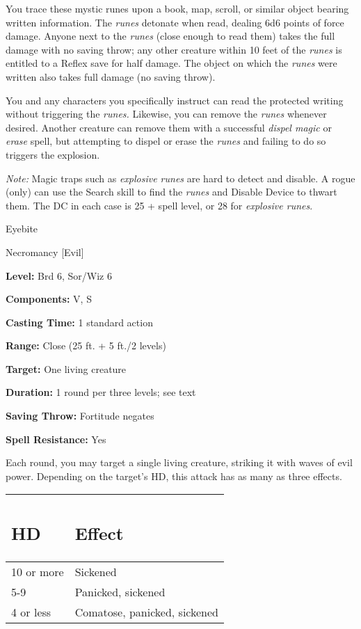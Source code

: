 \documentclass{article}
\begin{document}
You trace these mystic runes upon a book, map, scroll, or similar object bearing 
written information. The \textit{runes }detonate when read, dealing 6d6 points 
of force damage. Anyone next to the \textit{runes }(close enough to read them) 
takes the full damage with no saving throw; any other creature within 10 feet of 
the \textit{runes }is entitled to a Reflex save for half damage. The object on 
which the \textit{runes }were written also takes full damage (no saving throw).

You and any characters you specifically instruct can read the protected writing 
without triggering the \textit{runes. }Likewise, you can remove the \textit{runes 
}whenever desired. Another creature can remove them with a successful \textit{dispel 
magic }or \textit{erase }spell, but attempting to dispel or erase the \textit{runes 
}and failing to do so triggers the explosion.

\textit{Note: }Magic traps such as \textit{explosive runes }are hard to detect 
and disable. A rogue (only) can use the Search skill to find the \textit{runes 
}and Disable Device to thwart them. The DC in each case is 25 + spell level, or 
28 for \textit{explosive runes}.

\vspace{12pt}
Eyebite

Necromancy [Evil]

\textbf{Level:} Brd 6, Sor/Wiz 6

\textbf{Components:} V, S

\textbf{Casting Time:} 1 standard action

\textbf{Range:} Close (25 ft. + 5 ft./2 levels)

\textbf{Target:} One living creature

\textbf{Duration:} 1 round per three levels; see text

\textbf{Saving Throw:} Fortitude negates

\textbf{Spell Resistance:} Yes

Each round, you may target a single living creature, striking it with waves of 
evil power. Depending on the target's HD, this attack has as many as three effects.

\begin{tabular}{|>{\raggedright}p{42pt}|>{\raggedright}p{119pt}|}
\hline
\subsection*{H\textbf{D}} & \subsection*{E\textbf{ffect}}\tabularnewline
\hline
10 or more & Sickened\tabularnewline
\hline
5-9 & Panicked, sickened\tabularnewline
\hline
4 or less & Comatose, panicked, sickened\tabularnewline
\hline
\end{tabular}
\end{document}
